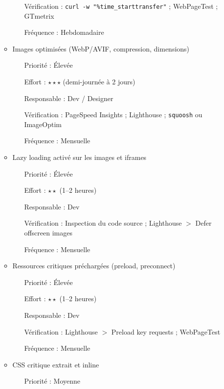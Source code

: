 \documentclass[12pt,a4paper,twoside]{report}
\begin{document}
\begin{enumerate}
\begin{itemize}
\begin{itemize}
            \item[Vérification :] \texttt{curl -w "\%{time\_starttransfer}"} ; WebPageTest ; GTmetrix
            \item[Fréquence :] Hebdomadaire
        \end{itemize}
        \item Images optimisées (WebP/AVIF, compression, dimensions)
        \begin{itemize}
            \item[Priorité :] Élevée
            \item[Effort :] $\star\star\star$ (demi-journée à 2 jours)
            \item[Responsable :] Dev / Designer
            \item[Vérification :] PageSpeed Insights ; Lighthouse ; \texttt{squoosh} ou ImageOptim
            \item[Fréquence :] Mensuelle
        \end{itemize}
        \item Lazy loading activé sur les images et iframes
        \begin{itemize}
            \item[Priorité :] Élevée
            \item[Effort :] $\star\star$ (1--2 heures)
            \item[Responsable :] Dev
            \item[Vérification :] Inspection du code source ; Lighthouse $>$ Defer offscreen images
            \item[Fréquence :] Mensuelle
        \end{itemize}
        \item Ressources critiques préchargées (preload, preconnect)
        \begin{itemize}
            \item[Priorité :] Élevée
            \item[Effort :] $\star\star$ (1--2 heures)
            \item[Responsable :] Dev
            \item[Vérification :] Lighthouse $>$ Preload key requests ; WebPageTest
            \item[Fréquence :] Mensuelle
        \end{itemize}
        \item CSS critique extrait et inline
        \begin{itemize}
            \item[Priorité :] Moyenne

\end{itemize}
\end{itemize}
\end{enumerate}
\end{document}

